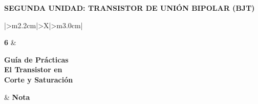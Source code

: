 \documentclass[11pt,a4paper]{article}
\let\needspace\Needspace
\begin{document}
\begin{center}
    {\normalsize\bfseries SEGUNDA UNIDAD: TRANSISTOR DE UNIÓN BIPOLAR (BJT)}
\end{center}

\vspace{0.55cm}

\begingroup
\renewcommand{\tabularxcolumn}[1]{m{#1}}
\renewcommand{\arraystretch}{2.0}
\setlength{\tabcolsep}{12pt}
\noindent
\begin{tabularx}{\textwidth}{|>{\centering\arraybackslash}m{2.2cm}|>{\centering\arraybackslash}X|>{\centering\arraybackslash}m{3.0cm}|}
\hline
\rule{0pt}{2.1cm}{\fontsize{58}{58}\selectfont\bfseries 6}
    & \begin{minipage}[c]{\linewidth}\centering
          {\large\bfseries Guía de Prácticas}\\[7pt]
          {\Large\bfseries El Transistor en\\ Corte y Saturación}
      \end{minipage}
    & {\Large\bfseries Nota}\\
\hline
{}\\
\hline
{}\\
\\
\hline
\end{tabularx}
\endgroup

\vspace{0.8cm}

\newcommand{\paso}[2]{%
  \par\needspace{10\baselineskip}\vspace{8pt}\noindent
  \colorbox{black!8}{\makebox[\dimexpr\linewidth-2\fboxsep\relax][l]{%
    \textbf{Paso #1 \,·\, #2}}}\par\vspace{4pt}}

\end{document}
